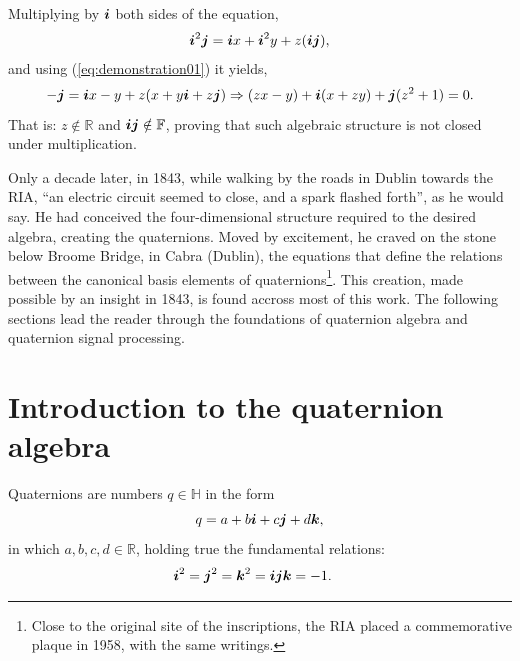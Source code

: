 Multiplying by $\boldsymbol{i}$ both sides of the equation,
\begin{equation}
\boldsymbol{i}^2 \boldsymbol{j} = \boldsymbol{i} x + \boldsymbol{i}^2 y + z (\boldsymbol{i} \boldsymbol{j}),
\end{equation}
and using (\ref{eq:demonstration01}) it yields,
\begin{equation}
- \boldsymbol{j} = \boldsymbol{i} x - y + z (x + y \boldsymbol{i} + z \boldsymbol{j})
\Rightarrow
(zx - y) + \boldsymbol{i} (x + zy) + \boldsymbol{j} (z^2 + 1) = 0.
\end{equation}
That is: $z \notin \mathbb{R}$ and $ \boldsymbol{i} \boldsymbol{j} \notin \mathbb{F} $, proving that such algebraic structure is not closed under multiplication.

Only a decade later, in 1843, while walking by the roads in Dublin towards the RIA, ``an electric circuit seemed to close, and a spark flashed forth'', as he would say. He had conceived the four-dimensional structure required to the desired algebra, creating the quaternions. Moved by excitement, he craved on the stone below Broome Bridge, in Cabra (Dublin), the equations that define the relations between the canonical basis elements of quaternions\footnote{Close to the original site of the inscriptions, the RIA placed a commemorative plaque in 1958, with the same writings.}. This creation, made possible by an insight in 1843, is found accross most of this work. The following sections lead the reader through the foundations of quaternion algebra and quaternion signal processing.


\section{Introduction to the quaternion algebra}

Quaternions are numbers $q \in \mathbb{H}$ in the form
\begin{equation}
q = a + b\boldsymbol{i} + c\boldsymbol{j} + d\boldsymbol{k},
\label{eq:q}
\end{equation}
in which $a, b, c, d \in \mathbb{R}$, holding true the fundamental relations:
\begin{equation}
\label{eq:fund_rel}
\begin{aligned}
\boldsymbol{i} ^2 = \boldsymbol{j}^2 &=\boldsymbol{k}^2 = \boldsymbol{i} \boldsymbol{j} \boldsymbol{k} = -1.
\end{aligned}
\end{equation}

